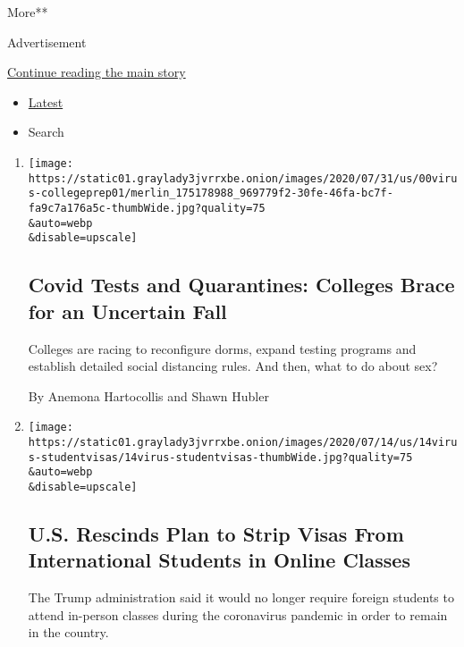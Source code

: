 More**

Advertisement

\protect\hyperlink{after-mid1}{Continue reading the main story}

\begin{itemize}
\tightlist
\item
  \protect\hyperlink{stream-panel}{Latest}
\item
  Search
\end{itemize}

\begin{enumerate}
\def\labelenumi{\arabic{enumi}.}
\item
  \href{/2020/08/02/us/covid-college-reopening.html}{}

  \texttt{[image: https://static01.graylady3jvrrxbe.onion/images/2020/07/31/us/00virus-collegeprep01/merlin\_175178988\_969779f2-30fe-46fa-bc7f-fa9c7a176a5c-thumbWide.jpg?quality=75\\\&auto=webp\\\&disable=upscale]}

  \hypertarget{covid-tests-and-quarantines-colleges-brace-for-an-uncertain-fall}{%
  \subsection{Covid Tests and Quarantines: Colleges Brace for an
  Uncertain
  Fall}\label{covid-tests-and-quarantines-colleges-brace-for-an-uncertain-fall}}

  Colleges are racing to reconfigure dorms, expand testing programs and
  establish detailed social distancing rules. And then, what to do about
  sex?

  By Anemona Hartocollis and Shawn Hubler
\item
  \href{/2020/07/14/us/coronavirus-international-foreign-student-visas.html}{}

  \texttt{[image: https://static01.graylady3jvrrxbe.onion/images/2020/07/14/us/14virus-studentvisas/14virus-studentvisas-thumbWide.jpg?quality=75\\\&auto=webp\\\&disable=upscale]}

  \hypertarget{us-rescinds-plan-to-strip-visas-from-international-students-in-online-classes}{%
  \subsection{U.S. Rescinds Plan to Strip Visas From International
  Students in Online
  Classes}\label{us-rescinds-plan-to-strip-visas-from-international-students-in-online-classes}}

  The Trump administration said it would no longer require foreign
  students to attend in-person classes during the coronavirus pandemic
  in order to remain in the country.


\end{enumerate}
